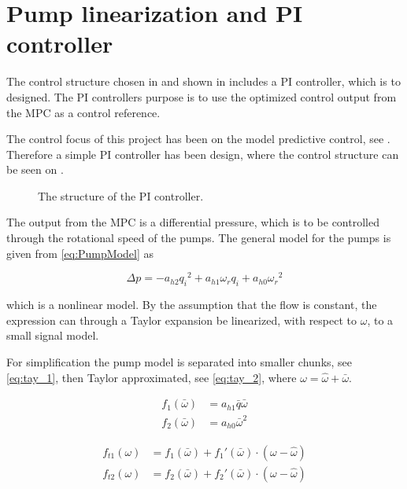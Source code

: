 \chapter{Pump linearization and PI controller}
\label{cha:linear_pump}

The control structure chosen in  and shown in  includes a PI controller, which is to designed. The PI controllers purpose is to use the optimized control output from the MPC as a control reference. 

The control focus of this project has been on the model predictive control, see . Therefore a simple PI controller has been design, where the control structure can be seen on .

\begin{figure}[H]
\centering
  
\caption{The structure of the PI controller.}
\label{fig:simple_PI}
\end{figure}

The output from the MPC is a differential pressure, which is to be controlled through the rotational speed of the pumps. The general model for the pumps is given from \eqref{eq:PumpModel} as 

\begin{equation*}
\Delta p = -a_{h2}{q_i}^2 + a_{h1} \omega_r q_i + a_{h0}{\omega_r}^2
\end{equation*}

which is a nonlinear model. By the assumption that the flow is constant, the expression can through a Taylor expansion be linearized, with respect to $\omega$, to a small signal model.


For simplification the pump model is separated into smaller chunks, see \eqref{eq:tay_1}, then Taylor approximated, see \eqref{eq:tay_2}, where $\omega = \hat{\omega}+\bar{\omega}$.

\begin{equation}
\begin{split}
f_1(\bar{\omega}) &= a_{h1}\bar{q}\bar{\omega} \\
f_2(\bar{\omega}) &= a_{h0}\bar{\omega}^2
\end{split}
\label{eq:tay_1}
\end{equation}


\begin{equation}
\begin{split}
f_{t1}(\omega) &= f_1(\bar{\omega}) + f_1'(\bar{\omega})\cdot(\omega - \hat{\omega}) \\
f_{t2}(\omega) &= f_2(\bar{\omega}) + f_2'(\bar{\omega})\cdot(\omega - \hat{\omega})
\end{split}
\label{eq:tay_2}
\end{equation}

